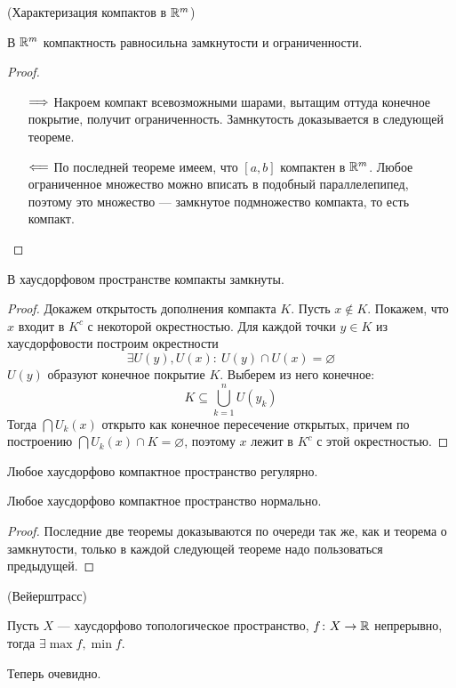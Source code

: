 \begin{theorem}(Характеризация компактов в $\mathbb{R}^m$)

	В $\mathbb{R}^m$ компактность равносильна замкнутости и ограниченности.
\end{theorem}
\begin{proof}
	\enewline
	\begin{itemize}
		\item[$\Longrightarrow$] Накроем компакт всевозможными шарами, вытащим оттуда
			конечное покрытие, получит ограниченность. Замнкутость доказывается
			в следующей теореме.
		\item[$\Longleftarrow$] По последней теореме имеем, что $[a, b]$ компактен в $\mathbb{R}^m$.
			Любое ограниченное множество можно вписать в подобный параллелепипед,
			поэтому это множество --- замкнутое подмножество компакта, то есть компакт.
	\end{itemize}
\end{proof}

\begin{theorem}
	В хаусдорфовом пространстве компакты замкнуты.
\end{theorem}
\begin{proof}
	Докажем открытость дополнения компакта $K$. Пусть $x \notin K$. Покажем,
	что $x$ входит в $K^c$ с некоторой окрестностью. Для каждой точки
	$y \in K$ из хаусдорфовости построим окрестности
\[
	\exists U(y), U(x)\colon~ U(y) \cap U(x) = \varnothing
\]
	$U(y)$ образуют конечное покрытие $K$. Выберем из него конечное:
\[
	K \subseteq \bigcup_{k = 1}^{n}{U(y_k)}
\]
	Тогда $\bigcap{U_k(x)}$ открыто как конечное пересечение открытых, причем
	по построению $\bigcap{U_k(x)} \cap K = \varnothing$, поэтому $x$ лежит
	в $K^c$ с этой окрестностью.
\end{proof}

\begin{theorem}
	Любое хаусдорфово компактное пространство регулярно.
\end{theorem}

\begin{theorem}
	Любое хаусдорфово компактное пространство нормально.
\end{theorem}
\begin{proof}
	Последние две теоремы доказываются по очереди так же, как и теорема
	о замкнутости, только в каждой следующей теореме надо пользоваться предыдущей.
\end{proof}

\begin{theorem}(Вейерштрасс)

	Пусть $X$ --- хаусдорфово топологическое пространство, $f \colon X \to \mathbb{R}$
	непрерывно, тогда $\exists \max{f}, \min{f}$.
\end{theorem}
\begin{theorem}
	Теперь очевидно.
\end{theorem}

